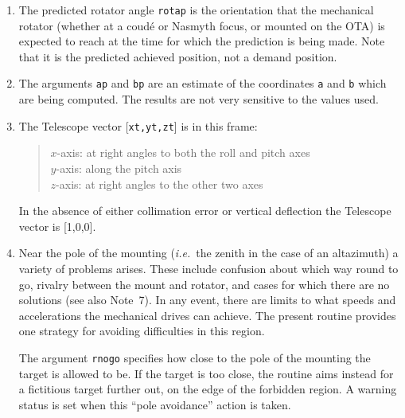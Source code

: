 \documentclass[12pt,fleqn,twoside]{article}
\renewcommand{\_}{{\tt\char'137}}     %
\begin{document}
{\begin{enumerate}
      In the present case, the encoder demands required to image the
      target corresponding to the specified {\sc Aim} vector at the
      specified pointing-origin are calculated.
\item The predicted rotator angle {\tt rotap} is the orientation that the
      mechanical rotator (whether at a coud\'e or Nasmyth focus, or
      mounted on the OTA) is expected to reach at the time for which
      the prediction is being made.  Note that it is the predicted
      achieved position, not a demand position.
\item The arguments {\tt ap} and {\tt bp} are an estimate of the coordinates
      {\tt a} and {\tt b} which are being computed.
      The results are not very
      sensitive to the values used.
\item The {\sc Telescope} vector [{\tt xt,yt,zt}] is in this frame:
      \begin{quote}
      $x$-axis:  at right angles to both the roll and pitch axes \\
      $y$-axis:  along the pitch axis \\
      $z$-axis:  at right angles to the other two axes
      \end{quote}
      In the absence of either collimation error or vertical deflection
      the {\sc Telescope} vector is [1,0,0].
\item Near the pole of the mounting ({\it i.e.}~the zenith in the case of an
      altazimuth) a variety of problems arises.  These include
      confusion about which way round to go, rivalry between the mount
      and rotator, and cases for which there are no solutions (see also
      Note~7).  In any event, there are limits to what speeds and
      accelerations the mechanical drives can achieve.  The present
      routine provides one strategy for avoiding difficulties in this
      region.

      The argument {\tt rnogo} specifies how close to the pole of the
      mounting the target is allowed to be.  If the target is too
      close, the routine aims instead for a fictitious target further
      out, on the edge of the forbidden region.  A warning status is
      set when this ``pole avoidance'' action is taken.


\end{enumerate}}
\end{document}
